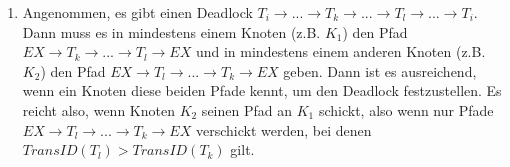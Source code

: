 \documentclass[a4paper]{article}
\begin{document}
\begin{enumerate}[label=\alph*)]
\item Angenommen, es gibt einen Deadlock $T_i\rightarrow...\rightarrow T_k \rightarrow ...\rightarrow T_l \rightarrow ... \rightarrow T_i$.\\
Dann muss es in mindestens einem Knoten (z.B. $K_1$) den Pfad $EX\rightarrow T_k \rightarrow ... \rightarrow T_l \rightarrow EX$ und in mindestens einem anderen Knoten (z.B. $K_2$) den Pfad $EX\rightarrow T_l \rightarrow ... \rightarrow T_k \rightarrow EX$ geben. Dann ist es ausreichend, wenn ein Knoten diese beiden Pfade kennt, um den Deadlock festzustellen. Es reicht also, wenn Knoten $K_2$ seinen Pfad an $K_1$ schickt, also wenn nur Pfade  $EX\rightarrow T_l \rightarrow ... \rightarrow T_k \rightarrow EX$ verschickt werden, bei denen $TransID(T_l)>TransID(T_k)$ gilt.
\end{enumerate}
\end{document}
